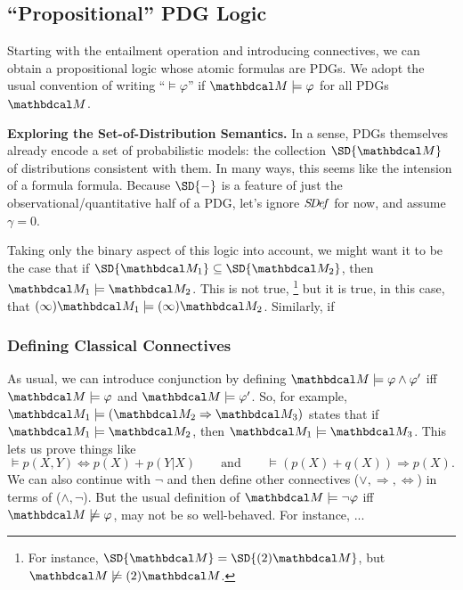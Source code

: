 \subsection{``Propositional'' PDG Logic}
Starting with the entailment operation and introducing connectives, we 
can obtain a propositional logic whose atomic formulas are PDGs. 
We  adopt the usual convention of writing 
``$\models \varphi$'' if $\dg M \models \varphi$ for all PDGs $\dg M$. 

\textbf{Exploring the Set-of-Distribution Semantics.}
In a sense, PDGs themselves already encode a set of probabilistic models: the 
collection $\SD{\dg M}$ of distributions consistent with them. In many
ways, this seems like the intension of a formula formula.  
Because $\SD{-}$ is a feature of just the observational/quantitative
half of a PDG, let's ignore $\mathit{S\mskip-3.5muD\mskip-2.5mue\mskip-1.5muf}$ for now, and assume $\gamma = 0$. 

Taking only the binary aspect of this logic into account, we might want
it to be the case that if $\SD{\dg M_1} \subseteq \SD{\dg M_2}$, then
$\dg M_1 \models \dg M_2$. This is not true,%
    \footnote{For instance, $\SD{\dg M} = \SD{(2) \dg M}$, but $\dg M \not\models (2) \dg M$.}
but it is true, in this case, that
$(\infty) \dg M_1 \models (\infty) \dg M_2$. 
Similarly, if 


\subsubsection{Defining Classical Connectives}

As usual, we can introduce conjunction by
    defining $\dg M \models \varphi \land \varphi'$ iff
    $\dg M \models \varphi$ and $\dg M \models \varphi'$.
So, for example, 
    $\dg M_1 \models (\dg M_2 \Rightarrow \dg M_3)$
    states that if $\dg M_1 \models \dg M_2$, then $\dg M_1 \models \dg M_3$. 
    This lets us prove things like
    \[
        \models p(X,Y) \Leftrightarrow p(X) + p(Y|X)
        \qquad
        \text{and}
        \qquad
        \models (p(X) + q(X)) \Rightarrow p(X).
    \]
We can also continue with $\lnot$ and then define other connectives
    ($\lor, \Rightarrow, \Leftrightarrow$) in terms of ($\land, \lnot$).    
But the usual definition of $\dg M \models \lnot \varphi$ iff 
    $\dg M \not\models \varphi$,
    may not be so well-behaved.
For instance, ...

